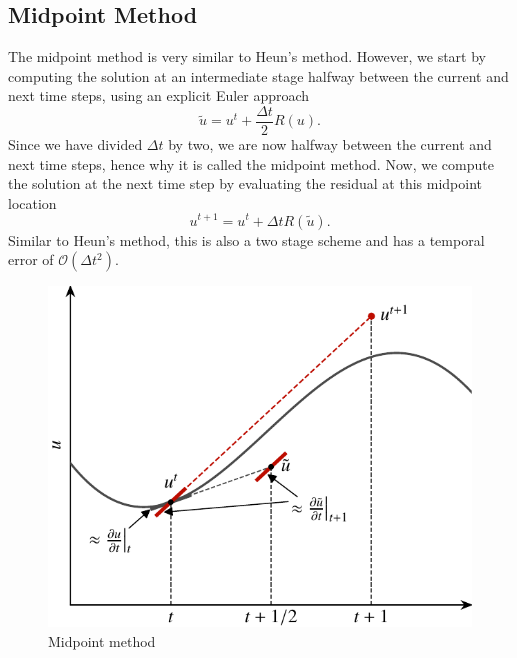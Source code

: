 \subsection{Midpoint Method}
The midpoint method is very similar to Heun's method. However, we start by computing the solution at an intermediate stage halfway between the current and next time steps, using an explicit Euler approach
\begin{equation}
	\tilde{u} = u^t + \frac{\Delta t}{2} R(u).
\end{equation}
Since we have divided $\Delta t$ by two, we are now halfway between the current and next time steps, hence why it is called the midpoint method. Now, we compute the solution at the next time step by evaluating the residual at this midpoint location
\begin{equation}
	u^{t+1} = u^t + \Delta t R(\tilde{u}).
\end{equation}
Similar to Heun's method, this is also a two stage scheme and has a temporal error of $\mathcal{O}(\Delta t^2)$.
\begin{figure}[htbp]
	\centering
	\includegraphics[width=0.6\linewidth]{Pictures/midpoint_method}
	\caption{Midpoint method}
	\label{fig:midpoint_method}
\end{figure}

